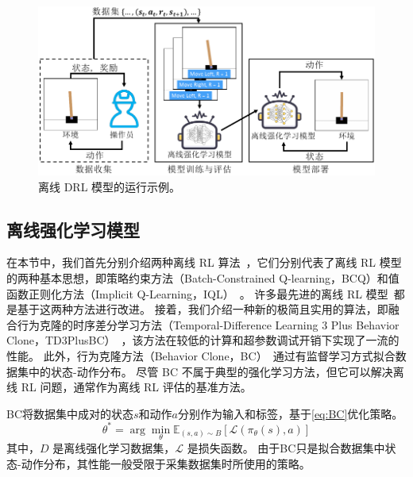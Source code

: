 \begin{figure}[!t]
    \centering
    \includegraphics[width=0.8\hsize]{figure/orl_auditor/offline-rlch.pdf}
    \caption{离线 DRL 模型的运行示例。}
    \label{fig:running example}
\end{figure}


\subsection{离线强化学习模型}
\label{sec:offline reinforcement learning model}
在本节中，我们首先分别介绍两种离线 RL 算法~\cite{DBLP:conf/icml/FujimotoMP19, DBLP:journals/corr/abs-1910-01708, DBLP:conf/iclr/KostrikovNL22}，它们分别代表了离线 RL 模型的两种基本思想，即策略约束方法（Batch-Constrained Q-learning，BCQ）和值函数正则化方法（Implicit Q-Learning，IQL）~\cite{DBLP:journals/corr/abs-2203-01387}。
许多最先进的离线 RL 模型~\cite{DBLP:conf/nips/YuKRRLF21, DBLP:conf/nips/KidambiRNJ20, DBLP:conf/nips/FujimotoG21, DBLP:conf/iclr/KostrikovNL22}都是基于这两种方法进行改进。
接着，我们介绍一种新的极简且实用的算法，即融合行为克隆的时序差分学习方法（Temporal-Difference Learning 3 Plus Behavior Clone，TD3PlusBC）~\cite{DBLP:conf/nips/FujimotoG21}，该方法在较低的计算和超参数调试开销下实现了一流的性能。
此外，行为克隆方法（Behavior Clone，BC）~\cite{DBLP:conf/nips/Pomerleau88}通过有监督学习方式拟合数据集中的状态-动作分布。
尽管 BC 不属于典型的强化学习方法，但它可以解决离线 RL 问题，通常作为离线 RL 评估的基准方法。

BC将数据集中成对的状态$s$和动作$a$分别作为输入和标签，基于\autoref{eq:BC}优化策略。
\begin{equation}
    \theta^*=\arg \min _\theta \mathbb{E}_{(s, a) \sim B}\left[\mathcal{L}\left(\pi_\theta(s), a\right)\right]
    \label{eq:BC}
\end{equation}
其中，$D$ 是离线强化学习数据集，$\mathcal{L}$ 是损失函数。
由于BC只是拟合数据集中状态-动作分布，其性能一般受限于采集数据集时所使用的策略。

